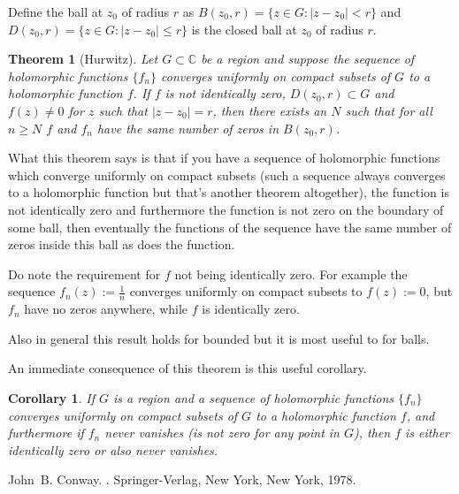 \documentclass[12pt]{article}
\theoremstyle{theorem}
\newtheorem*{thm}{Theorem}
\newtheorem*{cor}{Corollary}
\theoremstyle{definition}
\begin{document}
Define the ball at $z_0$ of radius $r$ as $B(z_0,r) = \{ z \in G : \lvert z-z_0 \rvert < r \}$ and $D(z_0,r) = \{ z \in G : \lvert z-z_0 \rvert \leq r \}$ is the closed ball at $z_0$ of radius $r$.

\begin{thm}[Hurwitz]
Let $G \subset {\mathbb{C}}$ be a region and suppose the sequence
of holomorphic functions $\{ f_n \}$ converges uniformly on compact subsets
of $G$ to a holomorphic function $f$.  If $f$ is not identically zero,
$D(z_0,r) \subset G$ and $f(z) \not= 0$ for $z$ such that
$\lvert z-z_0 \rvert = r$, then there exists an $N$ such that for all $n \geq N$
$f$ and $f_n$ have the same number of zeros in $B(z_0,r)$.
\end{thm}

What this theorem says is that if you have a sequence of holomorphic functions which converge uniformly on compact subsets (such a sequence always converges to a holomorphic function but that's another theorem altogether), the 
function is not identically zero and furthermore the  function is not
zero on the boundary of some ball,
then eventually 
the functions of the sequence have the same number of zeros inside this ball as does the  function.

Do note the requirement for $f$ not being identically zero.  For example the sequence $f_n(z) := \frac{1}{n}$ converges uniformly on compact subsets to
$f(z) := 0$, but $f_n$ have no zeros anywhere, while $f$ is identically zero.

Also in general this result holds for bounded  but it is most
useful to  for balls.

An immediate consequence of this theorem is this useful corollary.

\begin{cor}
If $G$ is a region and a sequence of holomorphic functions $\{ f_n \}$ converges
uniformly on compact subsets of $G$ to a holomorphic function $f$, and furthermore if $f_n$ never vanishes (is not zero for any point in $G$), then
$f$ is either identically zero or also never vanishes.
\end{cor}

\begin{thebibliography}{9}
John~B. Conway.
{\em {}}.
Springer-Verlag, New York, New York, 1978.
\end{thebibliography}
\end{document}
